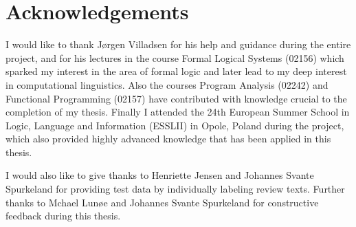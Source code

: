 
\chapter{Acknowledgements}

I would like to thank Jørgen Villadsen for his help and guidance during the entire project, and for his lectures in the course Formal Logical Systems (02156) which sparked my interest in the area of formal logic and later lead to my deep interest in computational linguistics. Also the courses Program Analysis (02242) and Functional Programming (02157) have contributed with knowledge crucial to the completion of my thesis. Finally I attended the 24th European Summer School in Logic, Language and Information (ESSLII) in Opole, Poland during the project, which also provided highly advanced knowledge that has been applied in this thesis.

I would also like to give thanks to Henriette Jensen and Johannes Svante Spurkeland for providing test data by individually labeling review texts. Further thanks to Mchael Lunøe and Johannes Svante Spurkeland for constructive feedback during this thesis.